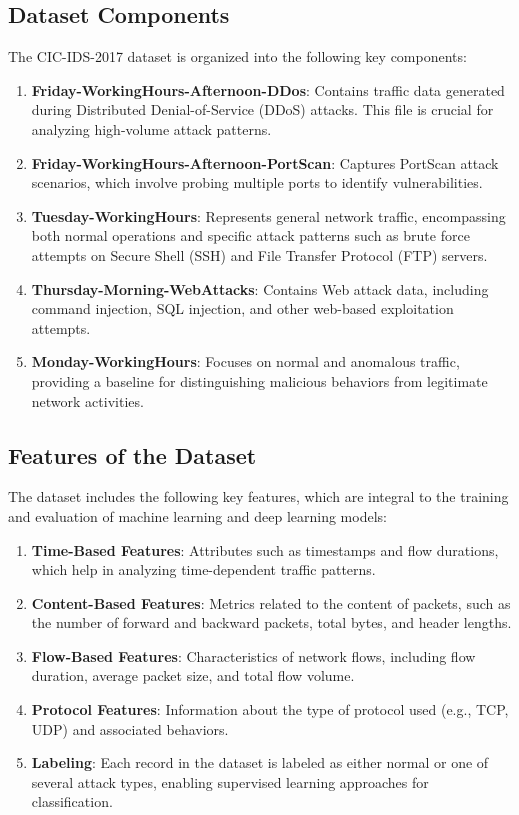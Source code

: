\documentclass[conference]{IEEEtran}
\begin{document}
\subsection{Dataset Components}
The CIC-IDS-2017 dataset is organized into the following key components:
\begin{enumerate}[label=\roman*.]
    \item \textbf{Friday-WorkingHours-Afternoon-DDos}: Contains traffic data generated during Distributed Denial-of-Service (DDoS) attacks. This file is crucial for analyzing high-volume attack patterns.
    \item \textbf{Friday-WorkingHours-Afternoon-PortScan}: Captures PortScan attack scenarios, which involve probing multiple ports to identify vulnerabilities.
    \item \textbf{Tuesday-WorkingHours}: Represents general network traffic, encompassing both normal operations and specific attack patterns such as brute force attempts on Secure Shell (SSH) and File Transfer Protocol (FTP) servers.
    \item \textbf{Thursday-Morning-WebAttacks}: Contains Web attack data, including command injection, SQL injection, and other web-based exploitation attempts.
    \item \textbf{Monday-WorkingHours}: Focuses on normal and anomalous traffic, providing a baseline for distinguishing malicious behaviors from legitimate network activities.
\end{enumerate}

\subsection{Features of the Dataset}
The dataset includes the following key features, which are integral to the training and evaluation of machine learning and deep learning models:
\begin{enumerate}[label=\roman*.]
    \item \textbf{Time-Based Features}: Attributes such as timestamps and flow durations, which help in analyzing time-dependent traffic patterns.
    \item \textbf{Content-Based Features}: Metrics related to the content of packets, such as the number of forward and backward packets, total bytes, and header lengths.
    \item \textbf{Flow-Based Features}: Characteristics of network flows, including flow duration, average packet size, and total flow volume.
    \item \textbf{Protocol Features}: Information about the type of protocol used (e.g., TCP, UDP) and associated behaviors.
    \item \textbf{Labeling}: Each record in the dataset is labeled as either normal or one of several attack types, enabling supervised learning approaches for classification.
\end{enumerate}
\end{document}
